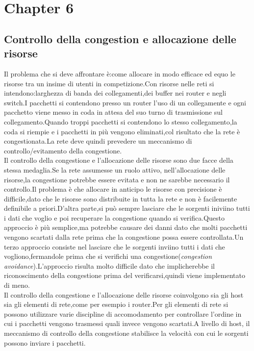 \chapter{Chapter 6}\label{ch:Chapter6}
\section{Controllo della congestion e allocazione delle risorse}
Il problema che si deve affrontare è:come allocare in modo efficace ed equo le risorse tra un insime di utenti in competizione.Con risorse nelle reti si intendono:larghezza di banda dei collegamenti,dei buffer nei router e negli switch.I pacchetti si contendono presso un router l'uso di un collegamente e ogni pacchetto viene messo in coda in attesa del suo turno di trasmissione sul collegamento.Quando troppi pacchetti si contendono lo stesso collegamento,la coda si riempie e i pacchetti in più vengono eliminati,col risultato che la rete è congestionata.La rete deve quindi prevedere un meccanismo di controllo/evitamento della congestione.\\
Il controllo della congestione e l'allocazione delle risorse sono due facce della stessa medaglia.Se la rete assumesse un ruolo attivo, nell'allocazione delle risorse,la congestione potrebbe essere evitata e non ne sarebbe necessario il controllo.Il problema è che allocare in anticipo le risorse con precisione è difficile,dato che le risorse sono distribuite in tutta la rete e non è facilemente definibile a priori.D'altra parte,si può sempre lasciare che le sorgenti iniviino tutti i dati che voglio e poi recuperare la congestione quando si verifica.Questo approccio è più semplice,ma potrebbe causare dei danni dato che molti pacchetti vengono scartati dalla rete prima che la congestione possa essere controllata.Un terzo approccio consiste nel lasciare che le sorgenti inviino tutti i dati che vogliono,fermandole prima che si verifichi una congestione(\textit{congestion avoidance}).L'approccio risulta molto difficile dato che implicherebbe il riconoscimento della congestione prima del verificarsi,quindi viene implementato di meno.\\
Il controllo della congestione e l'allocazione delle risorse coinvolgono sia gli host sia gli elementi di rete,come per esempio i router.Per gli elementi di rete si possono utilizzare varie discipline di accomodamento per controllare l'ordine in cui i pacchetti vengono trasmessi quali invece vengono scartati.A livello di host, il meccanismo di controllo della congestione stabilisce la velocità con cui le sorgenti possono inviare i pacchetti.
